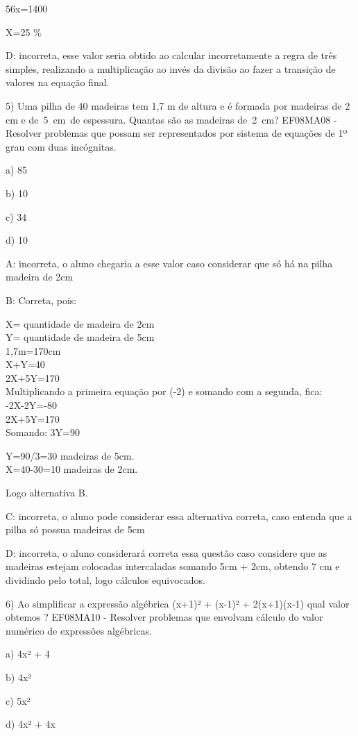 {56x=1400

X=25 \%

D: incorreta, esse valor seria obtido ao calcular incorretamente a regra
de três simples, realizando a multiplicação ao invés da divisão ao fazer
a transição de valores na equação final.

5) Uma pilha de 40 madeiras tem 1,7 m de altura e é formada por madeiras
de 2 cm e de~5~cm~de espessura. Quantas são as madeiras de~2~cm?
EF08MA08 - Resolver problemas que possam ser representados por sistema
de equações de 1º grau com duas incógnitas.

a) 85

b) 10

c) 34

d) 10

A: incorreta, o aluno chegaria a esse valor caso considerar que só há na
pilha madeira de 2cm

B: Correta, pois:

X= quantidade de madeira de 2cm\\
Y= quantidade de madeira de 5cm\\
1,7m=170cm\\
X+Y=40\\
2X+5Y=170\\
Multiplicando a primeira equação por (-2) e somando com a segunda,
fica:\\
-2X-2Y=-80\\
2X+5Y=170\\
Somando: 3Y=90

Y=90/3=30 madeiras de 5cm.\\
X=40-30=10 madeiras de 2cm.

Logo alternativa B.

C: incorreta, o aluno pode considerar essa alternativa correta, caso
entenda que a pilha só possua madeiras de 5cm

D: incorreta, o aluno considerará correta essa questão caso considere
que as madeiras estejam colocadas intercaladas somando 5cm + 2cm,
obtendo 7 cm e dividindo pelo total, logo cálculos equivocados.

6) Ao simplificar a expressão algébrica (x+1)² + (x-1)² + 2(x+1)(x-1)
qual valor obtemos ? EF08MA10 - Resolver problemas que envolvam cálculo
do valor numérico de expressões algébricas.

a) 4x² + 4

b) 4x²

c) 5x²

d) 4x² + 4x

}
